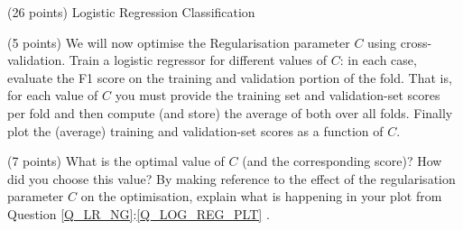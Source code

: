 \documentclass[12pt]{article}
\begin{document}
\begin{question}{(26 points) Logistic Regression Classification}
\begin{subquestion}
\end{subquestion}

\begin{subquestion}{\label{Q_LOG_REG_PLT}(5 points) We will now optimise the Regularisation parameter $C$ using cross-validation. Train a logistic regressor for different values of $C$: in each case, evaluate the F1 score on the training and validation portion of the fold. That is, for each value of $C$ you must provide the training set and validation-set scores per fold and then compute (and store) the average of both over all folds. Finally plot the (average) training and validation-set scores as a function of $C$. }






\end{subquestion}

\begin{subquestion}{(7 points) What is the optimal value of $C$ (and the corresponding score)? How did you choose this value? By making reference to the effect of the regularisation parameter $C$ on the optimisation, explain what is happening in your plot from Question \ref{Q_LR_NG}:\ref{Q_LOG_REG_PLT} .}




\end{subquestion}
\end{question}
\end{document}
